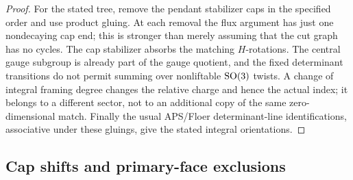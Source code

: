 \begin{proof}
For the stated tree, remove the pendant stabilizer caps in the
specified order and use product gluing.  At each removal the flux
argument has just one nondecaying cap end; this is stronger than
merely assuming that the cut graph has no cycles.
The cap stabilizer absorbs the matching $H$-rotations.  The
central gauge subgroup is already part of the gauge quotient,
and the fixed determinant transitions do not permit summing
over nonliftable $\operatorname{SO}(3)$ twists.  A change of integral framing
degree changes the relative charge and hence the actual index;
it belongs to a different sector, not to an additional copy of
the same zero-dimensional match.  Finally the usual APS/Floer
determinant-line identifications, associative under these
gluings, give the stated integral orientations.
\end{proof}

\subsection{Cap shifts and primary-face exclusions}


